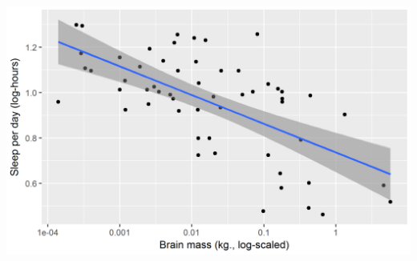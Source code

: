 \documentclass[t, 11pt]{beamer}
\begin{document}
\begin{frame}
	\frametitle{\insertsection} 
	\begin{center}
		\includegraphics[scale=0.2]{PI-reg2}
	\end{center}
	
\end{frame}
\end{document}

